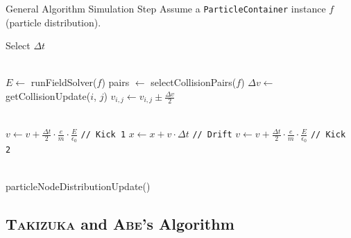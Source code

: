 \begin{frame}{General Algorithm Simulation Step}
    Assume a \texttt{ParticleContainer} instance $f$ (particle distribution). 
    \begin{algorithm}[H]
    \begin{algorithmic}[1]
        \STATE Select $\Delta t$
        
        \texttt{\\}
        \STATE $E \leftarrow$ runFieldSolver($f$)
        \STATE pairs $\leftarrow$ selectCollisionPairs($f$)
            \STATE $\Delta v \leftarrow$ getCollisionUpdate($i$, $j$) 
            \STATE $v_{i, j} \leftarrow v_{i, j} \pm \frac{\Delta v}{2}$ 
        \ENDFOR

        \texttt{\\}
        \STATE $v \leftarrow v + \frac{\Delta t}{2} \cdot \frac{e}{m} \cdot \frac{E}{\epsilon_0}$ \texttt{// Kick 1}
        \STATE $x \leftarrow x + v \cdot \Delta t$ \texttt{// Drift}
        \STATE $v \leftarrow v + \frac{\Delta t}{2} \cdot \frac{e}{m} \cdot \frac{E}{\epsilon_0}$ \texttt{// Kick 2}

        \texttt{\\}
        \STATE particleNodeDistributionUpdate()
    \end{algorithmic}
    \end{algorithm}
\end{frame}


\subsection{\textsc{Takizuka} and \textsc{Abe}'s Algorithm}

